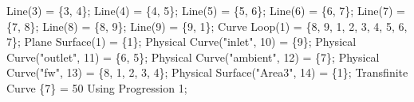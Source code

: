 \documentclass[11pt]{article}
\newenvironment{Shaded}{}{}
\newcommand{\DecValTok}[1]{\textcolor[rgb]{0.25,0.63,0.44}{{#1}}}
\newcommand{\StringTok}[1]{\textcolor[rgb]{0.25,0.44,0.63}{{#1}}}
\newcommand{\NormalTok}[1]{{#1}}
\newcommand{\OperatorTok}[1]{\textcolor[rgb]{0.40,0.40,0.40}{{#1}}}
\begin{document}
\begin{Shaded}
\begin{Highlighting}[]
\NormalTok{Line}\OperatorTok{(}\DecValTok{3}\OperatorTok{)} \OperatorTok{=} \OperatorTok{\{}\DecValTok{3}\OperatorTok{,} \DecValTok{4}\OperatorTok{\};}
\NormalTok{Line}\OperatorTok{(}\DecValTok{4}\OperatorTok{)} \OperatorTok{=} \OperatorTok{\{}\DecValTok{4}\OperatorTok{,} \DecValTok{5}\OperatorTok{\};}
\NormalTok{Line}\OperatorTok{(}\DecValTok{5}\OperatorTok{)} \OperatorTok{=} \OperatorTok{\{}\DecValTok{5}\OperatorTok{,} \DecValTok{6}\OperatorTok{\};}
\NormalTok{Line}\OperatorTok{(}\DecValTok{6}\OperatorTok{)} \OperatorTok{=} \OperatorTok{\{}\DecValTok{6}\OperatorTok{,} \DecValTok{7}\OperatorTok{\};}
\NormalTok{Line}\OperatorTok{(}\DecValTok{7}\OperatorTok{)} \OperatorTok{=} \OperatorTok{\{}\DecValTok{7}\OperatorTok{,} \DecValTok{8}\OperatorTok{\};}
\NormalTok{Line}\OperatorTok{(}\DecValTok{8}\OperatorTok{)} \OperatorTok{=} \OperatorTok{\{}\DecValTok{8}\OperatorTok{,} \DecValTok{9}\OperatorTok{\};}
\NormalTok{Line}\OperatorTok{(}\DecValTok{9}\OperatorTok{)} \OperatorTok{=} \OperatorTok{\{}\DecValTok{9}\OperatorTok{,} \DecValTok{1}\OperatorTok{\};}
\NormalTok{Curve Loop}\OperatorTok{(}\DecValTok{1}\OperatorTok{)} \OperatorTok{=} \OperatorTok{\{}\DecValTok{8}\OperatorTok{,} \DecValTok{9}\OperatorTok{,} \DecValTok{1}\OperatorTok{,} \DecValTok{2}\OperatorTok{,} \DecValTok{3}\OperatorTok{,} \DecValTok{4}\OperatorTok{,} \DecValTok{5}\OperatorTok{,} \DecValTok{6}\OperatorTok{,} \DecValTok{7}\OperatorTok{\};}
\NormalTok{Plane Surface}\OperatorTok{(}\DecValTok{1}\OperatorTok{)} \OperatorTok{=} \OperatorTok{\{}\DecValTok{1}\OperatorTok{\};}
\NormalTok{Physical Curve}\OperatorTok{(}\StringTok{"inlet"}\OperatorTok{,} \DecValTok{10}\OperatorTok{)} \OperatorTok{=} \OperatorTok{\{}\DecValTok{9}\OperatorTok{\};}
\NormalTok{Physical Curve}\OperatorTok{(}\StringTok{"outlet"}\OperatorTok{,} \DecValTok{11}\OperatorTok{)} \OperatorTok{=} \OperatorTok{\{}\DecValTok{6}\OperatorTok{,} \DecValTok{5}\OperatorTok{\};}
\NormalTok{Physical Curve}\OperatorTok{(}\StringTok{"ambient"}\OperatorTok{,} \DecValTok{12}\OperatorTok{)} \OperatorTok{=} \OperatorTok{\{}\DecValTok{7}\OperatorTok{\};}
\NormalTok{Physical Curve}\OperatorTok{(}\StringTok{"fw"}\OperatorTok{,} \DecValTok{13}\OperatorTok{)} \OperatorTok{=} \OperatorTok{\{}\DecValTok{8}\OperatorTok{,} \DecValTok{1}\OperatorTok{,} \DecValTok{2}\OperatorTok{,} \DecValTok{3}\OperatorTok{,} \DecValTok{4}\OperatorTok{\};}
\NormalTok{Physical Surface}\OperatorTok{(}\StringTok{"Area3"}\OperatorTok{,} \DecValTok{14}\OperatorTok{)} \OperatorTok{=} \OperatorTok{\{}\DecValTok{1}\OperatorTok{\};}
\NormalTok{Transfinite Curve }\OperatorTok{\{}\DecValTok{7}\OperatorTok{\}} \OperatorTok{=} \DecValTok{50}\NormalTok{ Using Progression }\DecValTok{1}\OperatorTok{;}

\end{Highlighting}
\end{Shaded}
\end{document}
